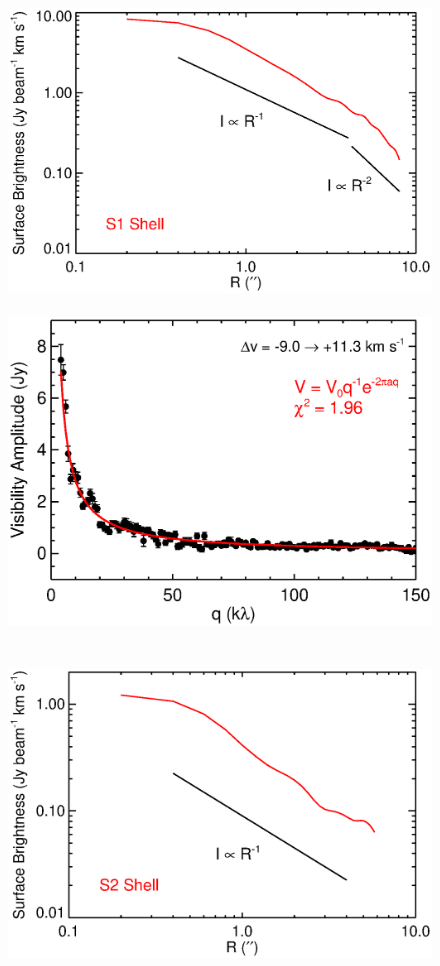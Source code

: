 \documentclass[iop]{emulateapj}
\begin{document}
\begin{figure}[hbt!]
\mbox{
          \includegraphics[scale=0.50]{s1_intensity_new.eps}
          \includegraphics[scale=0.50]{vis_s1.eps}
          }
\\
\mbox{
          \includegraphics[scale=0.50]{s2_intensity_new.eps}
}
\end{figure}
\end{document}
